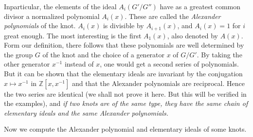 In\pageoriginale particular, the elements of the ideal $A_i (G' /
G'')$ have as a greatest common divisor a normalized polynomial $A_i
(x)$. These are called the \textit{Alexander polynomials} of the
knot. $A_i (x)$ is divisible by $A_{i+1} (x)$, and $A_i (x)= 1$ for
$i$ great enough. The most interesting is the first $A_1 (x)$, also
denoted by $A (x)$. Form our definition, there follows that these
polynomials are well determined by the group $G$ of the knot and the
choice of a generator $x$ of $G/G'$. By taking the other generator
$x^{-1}$ instead of $x$, one would get a second series of
polynomials. But it can be shown that the elementary ideals are
invariant by the conjugation $x \mapsto x^{-1}$ in $\mathbb{Z}[x,
  x^{-1}]$ and that the Alexander polynomials are reciprocal. Hence
the two series are identical (we shall not prove it here. But this will
be verified in the examples), and \textit{if two knots are of the
  same type, they have the same chain of elementary ideals and the
  same Alexander polynomials.}   

Now we compute the Alexander polynomial and elementary ideals of some
knots. 

